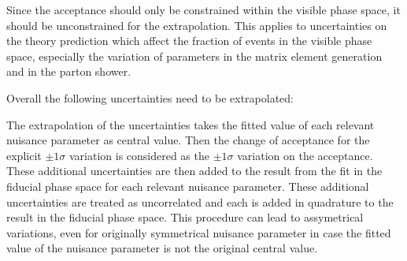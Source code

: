 Since the acceptance should only be constrained within the visible phase space, it should be unconstrained for the extrapolation.
This applies to uncertainties on the theory prediction which affect the fraction of events in the visible phase space, especially the variation
of parameters in the matrix element generation and in the parton shower.

Overall the following uncertainties need to be extrapolated: 

The extrapolation of the uncertainties takes the fitted value of each relevant nuisance parameter as central value. Then the change of acceptance for the explicit $\pm 1 \sigma$ variation is considered as the $\pm 1 \sigma$ variation on the acceptance. These additional uncertainties are then added to the result from the fit in the fiducial phase space for each relevant nuisance parameter. These additional uncertainties are treated as uncorrelated and each is added in quadrature to the result in the fiducial phase space. This procedure can lead to assymetrical variations, even for originally symmetrical nuisance parameter in case the fitted value of the nuisance parameter is not the original central value.





